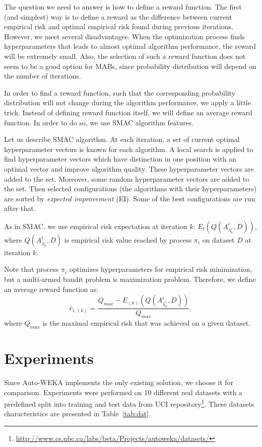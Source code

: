 \documentclass{svproc}
\begin{document}
The question we need to answer is how to define a reward function. The first (and simplest) way is to define a reward as the difference between current empirical risk and optimal empirical risk found during previous iterations. However, we meet several disadvantages. When the optimization process finds hyperparameters that leads to almost optimal algorithm performance, the reward will be extremely small. Also, the selection of such a reward function does not seem to be a good option for MABs, since probability distribution will depend on the number of iterations.

In order to find a reward function, such that the corresponding probability distribution will not change during the algorithm performance, we apply a little trick. Instead of defining reward function itself, we will define an average reward function. In order to do so, we use SMAC algorithm features.

Let us describe SMAC algorithm. At each iteration, a set of current optimal hyperparameter vectors is known for each algorithm. A local search is applied to find hyperparameter vectors which have distinction in one position with an optimal vector and improve algorithm quality. These hyperparameter vectors are added to the set. Moreover, some random hyperparameter vectors are added to the set. Then selected configurations (the algorithms with their hyperparameters) are sorted by \emph{expected improvement} (EI). Some of the best configurations are run after that.

As in SMAC, we use empirical risk expectation at iteration $k$: $E_t(Q(A^i_{\lambda^i_k}, D))$, where $Q(A^i_{\lambda^i_k}, D)$ is empirical risk value reached by process $\pi_i$ on dataset $D$ at iteration $k$.

Note that process $\pi_i$ optimizes hyperparameters for empirical risk minimization, but a multi-armed bandit problem is maximization problem. Therefore, we define an average reward function as:  
\[
\bar r_{i, (k)} = \frac {Q_{max} - E_{(k)}(Q(A^i_{\lambda^i_k}, D))} {Q_{max}},
\]
where $Q_{max}$ is the maximal empirical risk that was achieved on a given dataset.


\section{Experiments}
\label{sec:experiment}

Since Auto-WEKA implements the only existing solution, we choose it for comparison. Experiments were performed on 10 different real datasets with a predefined split into training and test data from UCI repository\footnote{\url{http://www.cs.ubc.ca/labs/beta/Projects/autoweka/datasets/}}. These datasets characteristics are presented in Table~\ref{tab:dat}.
\end{document}
